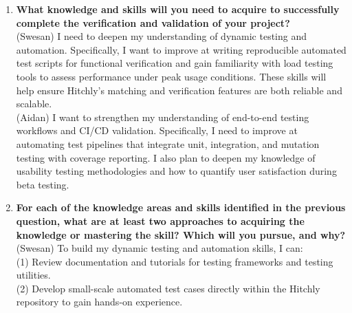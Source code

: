 \documentclass[12pt, titlepage]{article}
\begin{document}
\begin{enumerate}
\item \textbf{What knowledge and skills will you need to acquire to successfully complete the verification and validation of your project?}\\
(Swesan) I need to deepen my understanding of dynamic testing and automation. Specifically, I want to improve at writing reproducible automated test scripts for functional verification and gain familiarity with load testing tools to assess performance under peak usage conditions. These skills will help ensure Hitchly’s matching and verification features are both reliable and scalable.
\\(Aidan) I want to strengthen my understanding of end-to-end testing workflows and CI/CD validation. Specifically, I need to improve at automating test pipelines that integrate unit, integration, and mutation testing with coverage reporting. I also plan to deepen my knowledge of usability testing methodologies and how to quantify user satisfaction during beta testing.

\item \textbf{For each of the knowledge areas and skills identified in the previous question, what are at least two approaches to acquiring the knowledge or mastering the skill? Which will you pursue, and why?}\\
(Swesan) To build my dynamic testing and automation skills, I can:  \\
(1) Review documentation and tutorials for testing frameworks and testing utilities.  \\
(2) Develop small-scale automated test cases directly within the Hitchly repository to gain hands-on experience.  \\


\end{enumerate}
\end{document}
